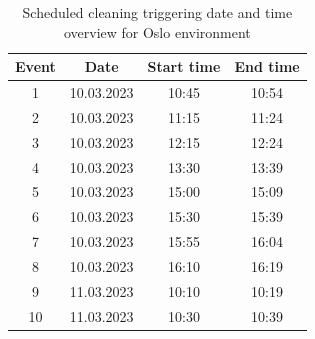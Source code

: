 \begin{table}[H]
\centering
\caption{Scheduled cleaning triggering date and time overview for Oslo environment}
\label{tab:SC_dateandtimeOslo}
\begin{tabular}{|c|c|c|c|}
\hline
\textbf{Event} & \textbf{Date} & \textbf{Start time} & \textbf{End time} \\ \hline
1              & 10.03.2023         & 10:45               & 10:54             \\ \hline
2              & 10.03.2023         & 11:15               & 11:24             \\ \hline
3              & 10.03.2023         & 12:15               & 12:24             \\ \hline
4              & 10.03.2023         & 13:30               & 13:39             \\ \hline
5              & 10.03.2023         & 15:00               & 15:09             \\ \hline
6              & 10.03.2023         & 15:30               & 15:39             \\ \hline
7              & 10.03.2023         & 15:55               & 16:04             \\ \hline
8              & 10.03.2023         & 16:10               & 16:19             \\ \hline
9              & 11.03.2023         & 10:10               & 10:19             \\ \hline
10             & 11.03.2023         & 10:30               & 10:39             \\ \hline
\end{tabular}
\end{table}

